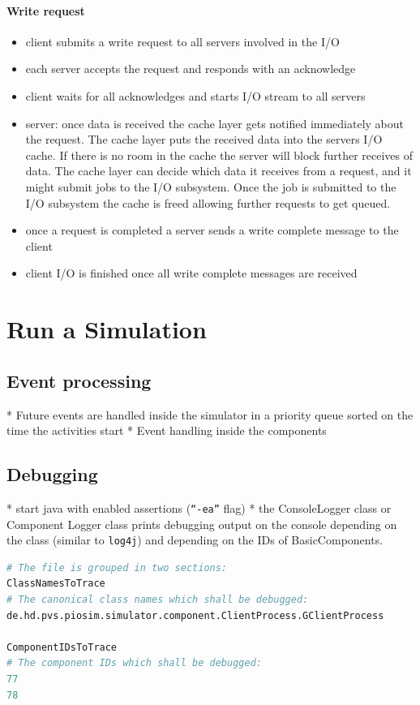 \documentclass[
     11pt,         %
     a4paper,      %
     BCOR10mm,     %
     DIV14,        %
     liststotoc,   %
     bibtotoc,     %
     idxtotoc,     %
     parskip       %
     ]{scrreprt}   %
\begin{document}
\paragraph{Write request}
\begin{itemize}
 \item client submits a write request to all servers involved in the I/O
 \item each server accepts the request and responds with an acknowledge
 \item client waits for all acknowledges and starts I/O stream to all servers
 \item server: once data is received the cache layer gets notified immediately about the request.
 The cache layer puts the received data into the servers I/O cache. If there is no room in the cache the server will 
 block further receives of data. 
 The cache layer can decide which data it receives from a request, and it might submit jobs to the I/O subsystem. 
 Once the job is submitted to the I/O subsystem the cache is freed allowing further requests to get queued.
 \item once a request is completed a server sends a write complete message to the client
 \item client I/O is finished once all write complete messages are received
\end{itemize}


\section{Run a Simulation}

\subsection{Event processing}
* Future events are handled inside the simulator in a priority queue sorted on the time the activities start
* Event handling inside the components

\subsection{Debugging}
* start java with enabled assertions (\texttt{"`-ea"'} flag)
* the ConsoleLogger class or Component Logger class prints debugging output on the console
depending on the class (similar to \texttt{log4j}) and depending on the IDs of BasicComponents.

\begin{lstlisting}[numbers=none,caption=Example debugging configuration file,label=
lst:debugConfigFile,language=Perl]
# The file is grouped in two sections:
ClassNamesToTrace
# The canonical class names which shall be debugged:
de.hd.pvs.piosim.simulator.component.ClientProcess.GClientProcess

ComponentIDsToTrace
# The component IDs which shall be debugged:
77
78
\end{lstlisting}
\end{document}
